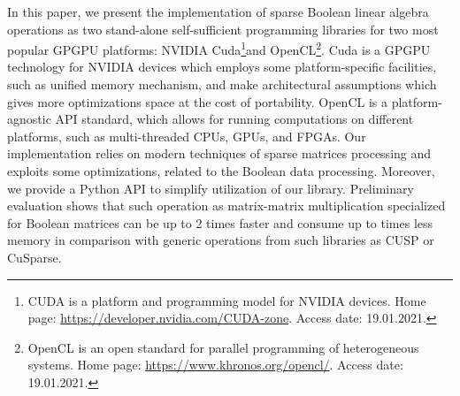 In this paper, we present the implementation of sparse Boolean linear algebra operations as two stand-alone self-sufficient programming libraries for two most popular GPGPU platforms: NVIDIA Cuda\footnote{CUDA is a platform and programming model for NVIDIA devices. Home page: \url{https://developer.nvidia.com/CUDA-zone}. Access date: 19.01.2021.}and OpenCL\footnote{OpenCL is an open standard for parallel programming of heterogeneous systems. Home page: \url{https://www.khronos.org/opencl/}. Access date: 19.01.2021.}.
Cuda is a GPGPU technology for NVIDIA devices which employs some platform-specific facilities, such as unified memory mechanism, and make architectural assumptions which gives more optimizations space at the cost of portability.
OpenCL is a platform-agnostic API standard, which allows for running computations on different platforms, such as multi-threaded CPUs, GPUs, and FPGAs.
Our implementation relies on modern techniques of sparse matrices processing and exploits some optimizations, related to the Boolean data processing.
Moreover, we provide a Python API to simplify utilization of our library.
Preliminary evaluation shows that such operation as matrix-matrix multiplication specialized for Boolean matrices can be up to 2 times faster and consume up to  times less memory in comparison with generic operations from such libraries as CUSP or CuSparse.